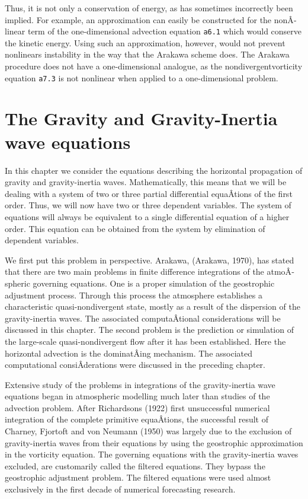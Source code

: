Thus, it is not only a conservation of energy, as has sometimes
incorrectly been implied. For example, an approximation can easily be
constructed for the nonÂ­linear term of the one-dimensional advection
equation \texttt{a6.1} which would conserve the kinetic energy. Using
such an approximation, however, would not prevent nonlinears instability
in the way that the Arakawa scheme does. The Arakawa procedure does not
have a one-dimensional analogue, as the nondivergentvorticity equation
\texttt{a7.3} is not nonlinear when applied to a one-dimensional
problem.

\section{The Gravity and Gravity-Inertia wave equations}\label{Chapter4}

In this chapter we consider the equations describing the horizontal
propagation of gravity and gravity-inertia waves. Mathematically, this
means that we will be dealing with a system of two or three partial
differential equaÂ­tions of the first order. Thus, we will now have two
or three dependent variables. The system of equations will always be
equivalent to a single differential equation of a higher order. This
equation can be obtained from the system by elimination of dependent
variables.

We first put this problem in perspective. Arakawa, (Arakawa, 1970), has
stated that there are two main problems in finite difference
integrations of the atmoÂ­spheric governing equations. One is a proper
simulation of the geostrophic adjustment process. Through this process
the atmosphere establishes a characteristic quasi-nondivergent state,
mostly as a result of the dispersion of the gravity-inertia waves. The
associated computaÂ­tional considerations will be discussed in this
chapter. The second problem is the prediction or simulation of the
large-scale quasi-nondivergent flow after it has been established. Here
the horizontal advection is the dominatÂ­ing mechanism. The associated
computational consiÂ­derations were discussed in the preceding chapter.

Extensive study of the problems in integrations of the gravity-inertia
wave equations began in atmospheric modelling much later than studies of
the advection problem. After Richardson\textquotesingle s (1922) first
unsuccessful numerical integration of the complete primitive equaÂ­tions,
the successful result of Charney, Fjortoft and von Neumann (1950) was
largely due to the exclusion of gravity-inertia waves from their
equations by using the geostrophic approximation in the vorticity
equation. The governing equations with the gravity-inertia waves
excluded, are customarily called the filtered equations. They bypass the
geostrophic adjustment problem. The filtered equations were used almost
exclusively in the first decade of numerical forecasting research.

